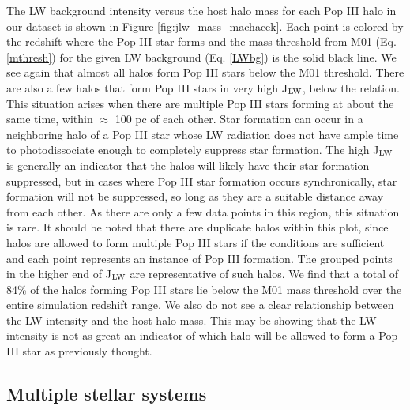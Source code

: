 \documentclass[a4paper,fleqn,usenatbib]{mnras}
\begin{document}
The LW background intensity versus the host halo mass for each Pop III halo in our dataset is shown in Figure \ref{fig:jlw_mass_machacek}. Each point is colored by the redshift where the Pop III star forms and the mass threshold from M01 (Eq. \ref{mthresh}) for the given LW background (Eq. \ref{LWbg}) is the solid black line. We see again that almost all halos form Pop III stars below the M01 threshold. There are also a few halos that form Pop III stars in very high J$_{\rm LW}$, below the relation. This situation arises when there are multiple Pop III stars forming at about the same time, within $\approx$ 100 pc of each other. Star formation can occur in a neighboring halo of a Pop III star whose LW radiation does not have ample time to photodissociate enough \hh{} to completely suppress star formation. The high J$_{\rm LW}$ is generally an indicator that the halos will likely have their star formation suppressed, but in cases where Pop III star formation occurs synchronically, star formation will not be suppressed, so long as they are a suitable distance away from each other. As there are only a few data points in this region, this situation is rare. It should be noted that there are duplicate halos within this plot, since halos are allowed to form multiple Pop III stars if the conditions are sufficient and each point represents an instance of Pop III formation. The grouped points in the higher end of J$_{\rm LW}$ are representative of such halos. We find that a total of 84\% of the halos forming Pop III stars lie below the M01 mass threshold over the entire simulation redshift range. We also do not see a clear relationship between the LW intensity and the host halo mass. This may be showing that the LW intensity is not as great an indicator of which halo will be allowed to form a Pop III star as previously thought. 

\subsection{Multiple stellar systems}
\end{document}
